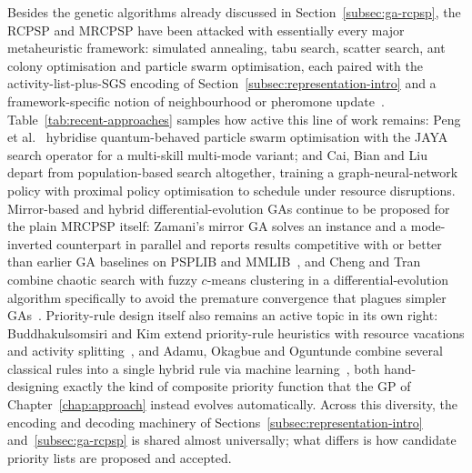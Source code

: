 Besides the genetic algorithms already discussed in
Section~\ref{subsec:ga-rcpsp}, the RCPSP and MRCPSP have been attacked with
essentially every major metaheuristic framework: simulated annealing, tabu
search, scatter search, ant colony optimisation and particle swarm
optimisation, each paired with the activity-list-plus-SGS encoding of
Section~\ref{subsec:representation-intro} and a framework-specific notion of
neighbourhood or pheromone update~\cite{kolisch2006,khajesaeedi2025review}.
Table~\ref{tab:recent-approaches} samples how active this line of work remains:
Peng et al.~\cite{peng2023quantumpso}
hybridise quantum-behaved particle swarm optimisation with the JAYA search
operator for a multi-skill multi-mode variant; and Cai, Bian and
Liu~\cite{cai2024rlgnn} depart from population-based search altogether, training
a graph-neural-network policy with proximal policy optimisation to schedule
under resource disruptions. Mirror-based and hybrid differential-evolution
GAs continue to be proposed for the plain MRCPSP itself: Zamani's mirror GA
solves an instance and a mode-inverted counterpart in parallel and reports
results competitive with or better than earlier GA baselines on PSPLIB and
MMLIB~\cite{zamani2019mirror}, and Cheng and Tran combine chaotic search with
fuzzy $c$-means clustering in a differential-evolution algorithm specifically
to avoid the premature convergence that plagues simpler
GAs~\cite{cheng2016fcde}. Priority-rule design itself also remains an active
topic in its own right: Buddhakulsomsiri and Kim extend priority-rule
heuristics with resource vacations and activity
splitting~\cite{buddhakulsomsiri2007}, and Adamu, Okagbue and Oguntunde
combine several classical rules into a single hybrid rule via machine
learning~\cite{adamu2019priority}, both hand-designing exactly the kind of
composite priority function that the GP of Chapter~\ref{chap:approach}
instead evolves automatically. Across this diversity, the encoding and decoding
machinery of Sections~\ref{subsec:representation-intro}
and~\ref{subsec:ga-rcpsp} is shared almost universally; what differs is how
candidate priority lists are proposed and accepted.

